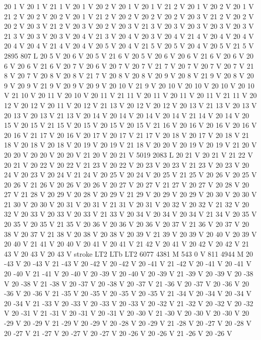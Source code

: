 {{20 1 V
20 1 V
21 1 V
20 1 V
20 2 V
20 1 V
20 1 V
21 2 V
20 1 V
20 2 V
20 1 V
21 2 V
20 2 V
20 2 V
20 1 V
21 2 V
20 2 V
20 2 V
20 2 V
20 3 V
21 2 V
20 2 V
20 2 V
20 3 V
21 2 V
20 3 V
20 2 V
20 3 V
21 3 V
20 3 V
20 3 V
20 3 V
20 3 V
21 3 V
20 3 V
20 3 V
20 4 V
21 3 V
20 4 V
20 3 V
20 4 V
21 4 V
20 4 V
20 4 V
20 4 V
20 4 V
21 4 V
20 4 V
20 5 V
20 4 V
21 5 V
20 5 V
20 4 V
20 5 V
21 5 V
2895 807 L
20 5 V
20 6 V
20 5 V
21 6 V
20 5 V
20 6 V
20 6 V
21 6 V
20 6 V
20 6 V
20 6 V
21 6 V
20 7 V
20 6 V
20 7 V
20 7 V
21 7 V
20 7 V
20 7 V
20 7 V
21 8 V
20 7 V
20 8 V
20 8 V
21 7 V
20 8 V
20 8 V
20 9 V
20 8 V
21 9 V
20 8 V
20 9 V
20 9 V
21 9 V
20 9 V
20 9 V
20 10 V
21 9 V
20 10 V
20 10 V
20 10 V
20 10 V
21 10 V
20 11 V
20 10 V
20 11 V
21 11 V
20 11 V
20 11 V
20 11 V
21 11 V
20 12 V
20 12 V
20 11 V
20 12 V
21 13 V
20 12 V
20 12 V
20 13 V
21 13 V
20 13 V
20 13 V
20 13 V
21 13 V
20 14 V
20 14 V
20 14 V
20 14 V
21 14 V
20 14 V
20 15 V
20 15 V
21 15 V
20 15 V
20 15 V
20 15 V
21 16 V
20 16 V
20 16 V
20 16 V
20 16 V
21 17 V
20 16 V
20 17 V
20 17 V
21 17 V
20 18 V
20 17 V
20 18 V
21 18 V
20 18 V
20 18 V
20 19 V
20 19 V
21 18 V
20 20 V
20 19 V
20 19 V
21 20 V
20 20 V
20 20 V
20 20 V
21 20 V
20 21 V
5019 2083 L
20 21 V
20 21 V
21 22 V
20 21 V
20 22 V
20 22 V
21 23 V
20 22 V
20 23 V
20 23 V
21 23 V
20 23 V
20 24 V
20 23 V
20 24 V
21 24 V
20 25 V
20 24 V
20 25 V
21 25 V
20 26 V
20 25 V
20 26 V
21 26 V
20 26 V
20 26 V
20 27 V
20 27 V
21 27 V
20 27 V
20 28 V
20 27 V
21 28 V
20 29 V
20 28 V
20 29 V
21 29 V
20 29 V
20 29 V
20 30 V
20 30 V
21 30 V
20 30 V
20 31 V
20 31 V
21 31 V
20 31 V
20 32 V
20 32 V
21 32 V
20 32 V
20 33 V
20 33 V
20 33 V
21 33 V
20 34 V
20 34 V
20 34 V
21 34 V
20 35 V
20 35 V
20 35 V
21 35 V
20 36 V
20 36 V
20 36 V
20 37 V
21 36 V
20 37 V
20 38 V
20 37 V
21 38 V
20 38 V
20 38 V
20 39 V
21 39 V
20 39 V
20 40 V
20 39 V
20 40 V
21 41 V
20 40 V
20 41 V
20 41 V
21 42 V
20 41 V
20 42 V
20 42 V
21 43 V
20 43 V
20 43 V
stroke
LT2
LTb
LT2
6077 4381 M
543 0 V
811 4944 M
20 -43 V
20 -43 V
21 -43 V
20 -42 V
20 -42 V
20 -41 V
21 -42 V
20 -41 V
20 -41 V
20 -40 V
21 -41 V
20 -40 V
20 -39 V
20 -40 V
20 -39 V
21 -39 V
20 -39 V
20 -38 V
20 -38 V
21 -38 V
20 -37 V
20 -38 V
20 -37 V
21 -36 V
20 -37 V
20 -36 V
20 -36 V
20 -36 V
21 -35 V
20 -35 V
20 -35 V
20 -35 V
21 -34 V
20 -34 V
20 -34 V
20 -34 V
21 -33 V
20 -33 V
20 -33 V
20 -33 V
20 -32 V
21 -32 V
20 -32 V
20 -32 V
20 -31 V
21 -31 V
20 -31 V
20 -31 V
20 -30 V
21 -30 V
20 -30 V
20 -30 V
20 -29 V
20 -29 V
21 -29 V
20 -29 V
20 -28 V
20 -29 V
21 -28 V
20 -27 V
20 -28 V
20 -27 V
21 -27 V
20 -27 V
20 -27 V
20 -26 V
20 -26 V
21 -26 V
20 -26 V
}}
